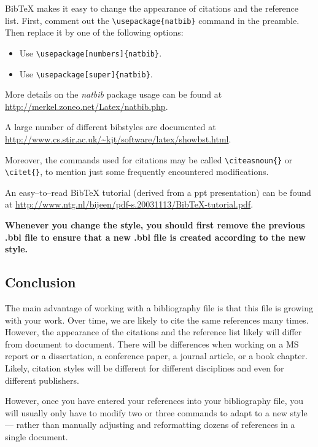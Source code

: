 \documentclass[12pt]{article}
\begin{document}
BibTeX makes it easy to change the appearance of citations 
and the reference list. First, comment out the 
\verb|\usepackage{natbib}| command in the preamble.
Then replace it by one of the following options:

\begin{itemize}
\item Use \verb|\usepackage[numbers]{natbib}|.
\item Use \verb|\usepackage[super]{natbib}|.
\end{itemize}

More details on the {\it natbib} package usage can be found at
\url{http://merkel.zoneo.net/Latex/natbib.php}.

A large number of different bibstyles are
documented at 
\url{http://www.cs.stir.ac.uk/~kjt/software/latex/showbst.html}.

Moreover, the commands used for citations may be called
\verb|\citeasnoun{}| or \verb|\citet{}|, to mention just some
frequently encountered modifications.

An easy--to--read BibTeX tutorial (derived from a ppt presentation) 
can be found at 
\url{http://www.ntg.nl/bijeen/pdf-s.20031113/BibTeX-tutorial.pdf}.

{\bf Whenever you change the style, you should first
remove the previous .bbl file to ensure that a new .bbl file
is created according to the new style.}


\subsection{Conclusion}

The main advantage of working with a bibliography file is that this
file is growing with your work. Over time, we are likely to cite
the same references many times. However, the appearance
of the citations and the reference list likely will differ from
document to document. There will be differences
when working on a MS report or a dissertation, a conference paper,
a journal article, or a book chapter. Likely, citation styles will be different
for different disciplines and even for different publishers.

However, once you have entered your references into your bibliography file,
you will usually only have to modify two or three commands
to adapt to a new style --- rather than manually adjusting
and reformatting dozens of references in a single document.

%
%
\end{document}
